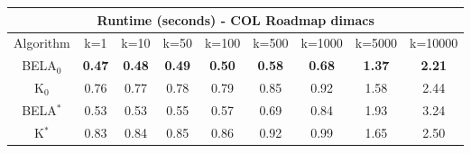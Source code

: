 \begin{tabular}{c|cccccccc}\toprule
\multicolumn{9}{c}{Runtime (seconds) - COL Roadmap dimacs}\\ \midrule
Algorithm & k=1 & k=10 & k=50 & k=100 & k=500 & k=1000 & k=5000 & k=10000 \\ \midrule
BELA$_0$ & \textbf{0.47} & \textbf{0.48} & \textbf{0.49} & \textbf{0.50} & \textbf{0.58} & \textbf{0.68} & \textbf{1.37} & \textbf{2.21} \\
K$_0$ & 0.76 & 0.77 & 0.78 & 0.79 & 0.85 & 0.92 & 1.58 & 2.44 \\
BELA$^*$ & 0.53 & 0.53 & 0.55 & 0.57 & 0.69 & 0.84 & 1.93 & 3.24 \\
K$^*$ & 0.83 & 0.84 & 0.85 & 0.86 & 0.92 & 0.99 & 1.65 & 2.50 \\ \bottomrule 
\end{tabular}
